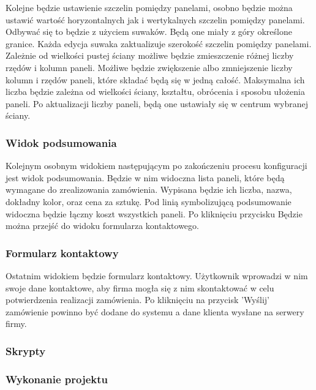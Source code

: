 \documentclass{article} %
\begin{document}
        Kolejne będzie ustawienie szczelin pomiędzy panelami, osobno będzie można ustawić wartość horyzontalnych jak i wertykalnych szczelin pomiędzy panelami. Odbywać się to będzie z użyciem suwaków. Będą one miały z góry określone granice. Każda edycja suwaka zaktualizuje szerokość szczelin pomiędzy panelami.
        \\
        
        Zależnie od wielkości pustej ściany możliwe będzie zmieszczenie różnej liczby rzędów i kolumn paneli. Możliwe będzie zwiększenie albo zmniejszenie liczby kolumn i rzędów paneli, które składać będą się w jedną całość. Maksymalna ich liczba będzie zależna od wielkości ściany, kształtu, obrócenia i sposobu ułożenia paneli. Po aktualizacji liczby paneli, będą one ustawiały się w centrum wybranej ściany.
        \\
        
        \subsubsection*{Widok podsumowania}
        Kolejnym osobnym widokiem następującym po zakończeniu procesu konfiguracji jest widok podsumowania. Będzie w nim widoczna lista paneli, które będą wymagane do zrealizowania zamówienia. Wypisana będzie ich liczba, nazwa, dokładny kolor, oraz cena za sztukę. Pod linią symbolizującą podsumowanie widoczna będzie łączny koszt wszystkich paneli. Po kliknięciu przycisku Będzie można przejść do widoku formularza kontaktowego.
        \\
        
        \subsubsection*{Formularz kontaktowy}
        Ostatnim widokiem będzie formularz kontaktowy. Użytkownik  wprowadzi w nim swoje dane kontaktowe, aby firma mogła się z nim skontaktować w celu potwierdzenia realizacji zamówienia. Po kliknięciu na przycisk 'Wyślij' zamówienie powinno być dodane do systemu a dane klienta wysłane na serwery firmy.
        \\
        
        
        \subsubsection{Skrypty}
        
        \subsubsection{Wykonanie projektu}
    
\end{document}
